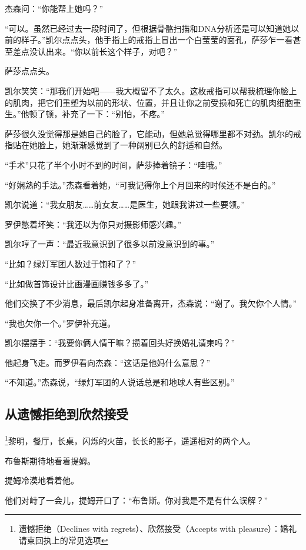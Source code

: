 \documentclass[../main]{subfiles}
\begin{document}
杰森问：“你能帮上她吗？”

“可以。虽然已经过去一段时间了，但根据骨骼扫描和DNA分析还是可以知道她以前的样子。”凯尔点点头，他手指上的戒指上冒出一个白莹莹的面孔，萨莎乍一看甚至差点没认出来。“你以前长这个样子，对吧？”

萨莎点点头。

凯尔笑笑：“那我们开始吧——我大概留不了太久。这枚戒指可以帮我梳理你脸上的肌肉，把它们重塑为以前的形状、位置，并且让你之前受损和死亡的肌肉细胞重生。”他顿了顿，补充了一下：“别怕，不疼。”

萨莎很久没觉得那是她自己的脸了，它能动，但她总觉得哪里都不对劲。凯尔的戒指贴在她脸上，她渐渐感觉到了一种阔别已久的舒适和自然。

“手术”只花了半个小时不到的时间，萨莎捧着镜子：“哇哦。”

“好娴熟的手法。”杰森看着她，“可我记得你上个月回来的时候还不是白的。”

凯尔说道：“我女朋友……前女友……是医生，她跟我讲过一些要领。”

罗伊憋着坏笑：“我还以为你只对摄影师感兴趣。”

凯尔哼了一声：“最近我意识到了很多以前没意识到的事。”

“比如？绿灯军团人数过于饱和了？”

“比如做首饰设计比画漫画赚钱多多了。”

他们交换了不少消息，最后凯尔起身准备离开，杰森说：“谢了。我欠你个人情。”

“我也欠你一个。”罗伊补充道。

凯尔摆摆手：“我要你俩人情干嘛？攒着回头好换婚礼请柬吗？”

他起身飞走。而罗伊看向杰森：“这话是他妈什么意思？”

“不知道。”杰森说，“绿灯军团的人说话总是和地球人有些区别。”


\subsection{从遗憾拒绝到欣然接受}

\footnote[1]{遗憾拒绝（Declines with regrets）、欣然接受（Accepts with pleasure）：婚礼请柬回执上的常见选项}黎明，餐厅，长桌，闪烁的火苗，长长的影子，遥遥相对的两个人。

布鲁斯期待地看着提姆。

提姆冷漠地看着他。

他们对峙了一会儿，提姆开口了：“布鲁斯。你对我是不是有什么误解？”
\end{document}
